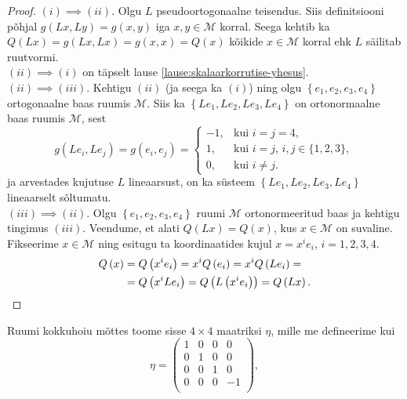 \documentclass[a4paper,12pt]{article}
\theoremstyle{plain}
\theoremstyle{definition}
\numberwithin{equation}{section}
\begin{document}
\begin{proof}
$(i) \implies (ii)$. Olgu $L$ pseudoortogonaalne teisendus. Siis definitsiooni põhjal $g\left(Lx, Ly\right) = g\left(x, y\right)$ iga $x, y \in \mathcal{M}$ korral. Seega kehtib ka $Q\left(Lx\right) = g\left(Lx, Lx\right) = g\left(x, x\right) = Q\left(x\right)$ kõikide $x \in \mathcal{M}$ korral ehk $L$ säilitab ruutvormi. \\
$(ii) \implies (i)$ on täpselt lause \ref{lause:skalaarkorrutise-yhesus}. \\
$(ii) \implies (iii)$. Kehtigu $(ii)$ (ja seega ka $(i)$) ning olgu $\left\lbrace e_1, e_2, e_3, e_4 \right\rbrace$ ortogonaalne baas ruumis $\mathcal{M}$. Siis ka $\left\lbrace Le_1, Le_2, Le_3, Le_4 \right\rbrace$ on ortonormaalne baas ruumis $\mathcal{M}$, sest
\begin{equation*}
g \left(Le_i, Le_j\right) = g\left(e_i, e_j\right) = \begin{cases}
    -1,& \text{kui $i = j = 4$},\\
    1,& \text{kui $i = j$, $i,j \in \{1, 2, 3\}$},\\
    0,& \text{kui $i \neq j$}.
  \end{cases}
\end{equation*}
ja arvestades kujutuse $L$ lineaarsust, on ka süsteem $\left\lbrace Le_1, Le_2, Le_3, Le_4 \right\rbrace$ lineaarselt sõltumatu. \\
$(iii) \implies (ii)$. Olgu $\left\lbrace e_1, e_2, e_3, e_4 \right\rbrace$ ruumi $\mathcal{M}$ ortonormeeritud baas ja kehtigu tingimus $(iii)$. Veendume, et alati $Q\left(Lx\right) = Q\left(x\right)$, kus $x \in \mathcal{M}$ on suvaline. Fikseerime $x \in \mathcal{M}$ ning esitugu ta koordinaatides kujul $x = x^i e_i$, $i = 1, 2, 3, 4$.
\begin{align*}
Q\left(x\right) &= Q\left(x^i e_i\right) = x^i Q\left(e_i\right) = x^i Q\left(Le_i\right) = \\
&= Q\left(x^i L e_i\right) = Q\left(L\left(x^i e_i\right)\right) = Q\left(Lx\right). \qedhere
\end{align*}
\end{proof}
%
Ruumi kokkuhoiu mõttes toome sisse $4 \times 4$ maatriksi $\eta$, mille me defineerime kui
\begin{equation*}
\eta = \begin{pmatrix}
1 & 0 & 0 & 0 \\ 
0 & 1 & 0 & 0 \\  
0 & 0 & 1 & 0 \\ 
0 & 0 & 0 & -1 \\ 
\end{pmatrix},
\end{equation*}
\end{document}
